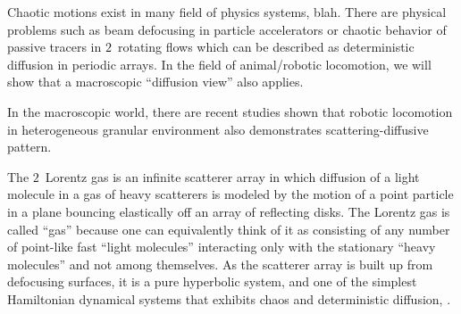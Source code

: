 Chaotic motions exist in many field of physics systems, blah. There are
physical problems such as beam defocusing in particle accelerators or
chaotic behavior of passive tracers in $2$\dmn\ rotating flows which can
be described as deterministic diffusion in periodic arrays. In the field
of animal/robotic locomotion, we will show that a macroscopic ``diffusion
view'' also applies.

In the macroscopic world, there are recent
studies shown that robotic locomotion in heterogeneous granular
environment also demonstrates scattering-diffusive pattern.



The $2$\dmn\ Lorentz gas is an infinite scatterer array in which
diffusion of a light molecule in a gas of heavy scatterers is modeled by
the motion of a point particle in a plane bouncing elastically
off an array of
reflecting disks. The Lorentz gas is called ``gas'' because one can
equivalently think of it as consisting of any number of point-like fast
``light molecules'' interacting only with the stationary ``heavy
molecules'' and not among themselves.  As the scatterer array is built up
from defocusing surfaces, it is a pure hyperbolic system,
and one of the simplest Hamiltonian dynamical systems that exhibits
chaos and
deterministic diffusion, .

